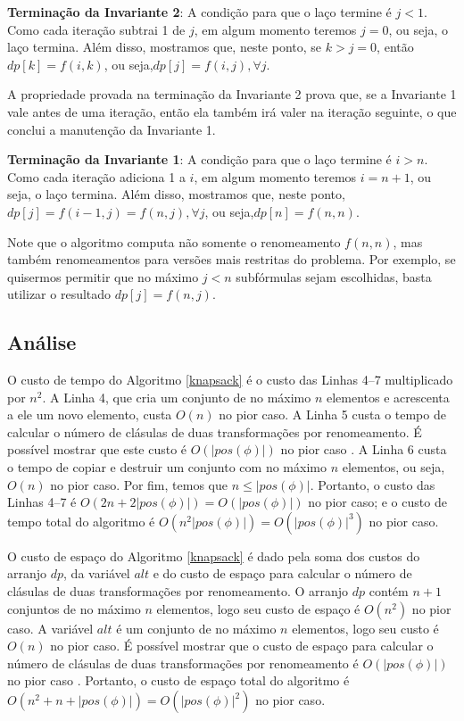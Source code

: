 \textbf{Terminação da Invariante 2}: A condição para que o laço termine é $j < 1$. Como cada iteração subtrai 1 de $j$, em algum momento teremos $j = 0$, ou seja, o laço termina. Além disso, mostramos que, neste ponto, se $k > j = 0$, então $dp[k] = f(i,k)$, ou seja,\break $dp[j] = f(i,j), \forall j$.

A propriedade provada na terminação da Invariante 2 prova que, se a Invariante 1 vale antes de uma iteração, então ela também irá valer na iteração seguinte, o que conclui a manutenção da Invariante 1.

\textbf{Terminação da Invariante 1}: A condição para que o laço termine é $i > n$. Como cada iteração adiciona 1 a $i$, em algum momento teremos $i = n+1$, ou seja, o laço termina. Além disso, mostramos que, neste ponto, $dp[j] = f(i-1,j) = f(n,j), \forall j$, ou seja,\break $dp[n] = f(n,n)$.

Note que o algoritmo computa não somente o renomeamento $f(n,n)$, mas também renomeamentos para versões mais restritas do problema. Por exemplo, se quisermos permitir que no máximo $j < n$ subfórmulas sejam escolhidas, basta utilizar o resultado $dp[j] = f(n,j)$.

\subsection{Análise}

\indent

O custo de tempo do Algoritmo \ref{knapsack} é o custo das Linhas 4--7 multiplicado por $n^2$. A Linha 4, que cria um conjunto de no máximo $n$ elementos e acrescenta a ele um novo elemento, custa $O(n)$ no pior caso. A Linha 5 custa o tempo de calcular o número de clásulas de duas transformações por renomeamento. É possível mostrar que este custo é $O(|pos(\phi)|)$ no pior caso \cite{nonnengart2001computing}. A Linha 6 custa o tempo de copiar e destruir um conjunto com no máximo $n$ elementos, ou seja, $O(n)$ no pior caso. Por fim, temos que $n \leq |pos(\phi)|$. Portanto, o custo das Linhas 4--7 é $O(2n + 2|pos(\phi)|) = O(|pos(\phi)|)$ no pior caso; e o custo de tempo total do algoritmo é $O(n^2 |pos(\phi)|) = O(|pos(\phi)|^3)$ no pior caso.

O custo de espaço do Algoritmo \ref{knapsack} é dado pela soma dos custos do arranjo $dp$, da variável $alt$ e do custo de espaço para calcular o número de clásulas de duas transformações por renomeamento. O arranjo $dp$ contém $n+1$ conjuntos de no máximo $n$ elementos, logo seu custo de espaço é $O(n^2)$ no pior caso. A variável $alt$ é um conjunto de no máximo $n$ elementos, logo seu custo é $O(n)$ no pior caso. É possível mostrar que o custo de espaço para calcular o número de clásulas de duas transformações por renomeamento é $O(|pos(\phi)|)$ no pior caso \cite{nonnengart2001computing}. Portanto, o custo de espaço total do algoritmo é\break $O(n^2 + n + |pos(\phi)|) = O(|pos(\phi)|^2)$ no pior caso.

